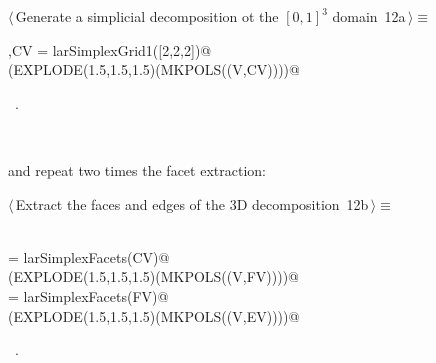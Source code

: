 \documentclass[11pt,oneside]{article}	%
\begin{document}
\begin{flushleft} \small
\begin{minipage}{\linewidth} \label{scrap15}
\protect{}$\langle\,$Generate a simplicial decomposition ot the $[0,1]^3$ domain\nobreak\ {\footnotesize 12a}$\,\rangle\equiv$
\vspace{-1ex}
\begin{list}{}{} \item
\mbox{}\verb@V,CV = larSimplexGrid1([2,2,2])@\\
\mbox{}\verb@VIEW(EXPLODE(1.5,1.5,1.5)(MKPOLS((V,CV))))@\\
\mbox{}\verb@@{\NWsep}
\end{list}
\vspace{-1ex}
\footnotesize\addtolength{\baselineskip}{-1ex}
\begin{list}{}{\setlength{\itemsep}{-\parsep}\setlength{\itemindent}{-\leftmargin}}
\item \NWtxtMacroRefIn\ .
\end{list}
\end{minipage}\\[4ex]
\end{flushleft}

and repeat two times the facet extraction:

\begin{flushleft} \small
\begin{minipage}{\linewidth} \label{scrap16}
\protect{}$\langle\,$Extract the faces and edges of the 3D decomposition\nobreak\ {\footnotesize 12b}$\,\rangle\equiv$
\vspace{-1ex}
\begin{list}{}{} \item
\mbox{}\verb@@\\
\mbox{}\verb@FV = larSimplexFacets(CV)@\\
\mbox{}\verb@VIEW(EXPLODE(1.5,1.5,1.5)(MKPOLS((V,FV))))@\\
\mbox{}\verb@EV = larSimplexFacets(FV)@\\
\mbox{}\verb@VIEW(EXPLODE(1.5,1.5,1.5)(MKPOLS((V,EV))))@\\
\mbox{}\verb@@{\NWsep}
\end{list}
\vspace{-1ex}
\footnotesize\addtolength{\baselineskip}{-1ex}
\begin{list}{}{\setlength{\itemsep}{-\parsep}\setlength{\itemindent}{-\leftmargin}}
\item \NWtxtMacroRefIn\ .
\end{list}
\end{minipage}\\[4ex]
\end{flushleft}
\end{document}

